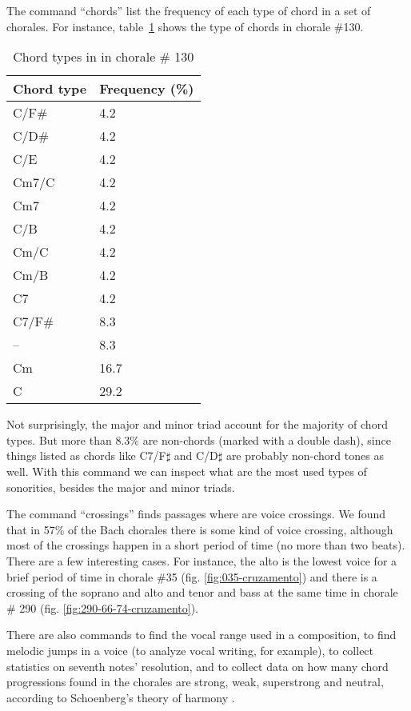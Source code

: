 The command ``chords'' list the frequency of each type of chord in a
set of chorales. For instance, table~\ref{tab:ctc130} shows the type
of chords in chorale \#130.

\begin{table}[t]
  \centering
\begin{tabular}{l|l} \hline
 Chord type & Frequency (\%) \\ \hline
 C/F\#                & 4.2 \\
 C/D\#                & 4.2\\
 C/E                 & 4.2\\
 Cm7/C               & 4.2\\
 Cm7                 & 4.2\\
 C/B                 & 4.2\\
 Cm/C                & 4.2\\
 Cm/B                & 4.2\\
 C7                  & 4.2\\
 C7/F\#               & 8.3\\
 --                  & 8.3\\
 Cm                  &16.7\\
 C                   &29.2 \\ \hline
\end{tabular}
\caption{Chord types in in chorale \# 130}
\label{tab:ctc130}
\end{table}

Not surprisingly, the major and minor triad account for the majority
of chord types. But more than 8.3\% are non-chords (marked with a
double dash), since things listed as chords like C7/F$\sharp$ and
C/D$\sharp$ are probably non-chord tones as well. With this command we
can inspect what are the most used types of sonorities, besides the
major and minor triads.

The command ``crossings'' finds passages where are voice crossings. We
found that in 57\% of the Bach chorales there is some kind of voice
crossing, although most of the crossings happen in a short period of
time (no more than two beats). There are a few interesting cases. For
instance, the alto is the lowest voice for a brief period of time in
chorale \#35 (fig. \ref{fig:035-cruzamento}) and there is a crossing
of the soprano and alto and tenor and bass at the same time in chorale
\# 290 (fig. \ref{fig:290-66-74-cruzamento}).

There are also commands to find the vocal range used in a composition,
to find melodic jumps in a voice (to analyze vocal writing, for
example), to collect statistics on seventh notes' resolution, and to
collect data on how many chord progressions found in the chorales are
strong, weak, superstrong and neutral, according to Schoenberg's
theory of harmony \cite{schoenberg83:theory}.

